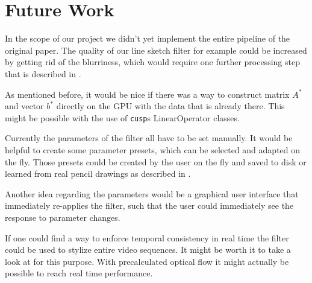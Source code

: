 \section{Future Work} \label{future-work}
In the scope of our project we didn't yet implement the entire pipeline of the
original paper. 
The quality of our line sketch filter for example could be increased by getting
rid of the blurriness, which would require one further processing step that is
described in \cite{mainPaper}.

As mentioned before, it would be nice if there was a way to construct matrix
$A^*$ and vector $b^*$ directly on the GPU with the data that is already
there. This might be possible with the use of \texttt{cusp}s LinearOperator
classes.

Currently the parameters of the filter all have to be set manually. It would be
helpful to create some parameter presets, which can be selected and adapted on
the fly. Those presets could be created by the user on the fly and saved to disk
or learned from real pencil drawings as described in \cite{mainPaper}.

Another idea regarding the parameters would be a graphical user interface that immediately
re-applies the filter, such that the user could immediately see the
response to parameter changes. 

If one could find a way to enforce temporal consistency in real time the filter
could be used to stylize entire video sequences. It might be worth it to take a
look at \cite{temporal-consistency} for this purpose. With precalculated optical
flow it might actually be possible to reach real time performance.

